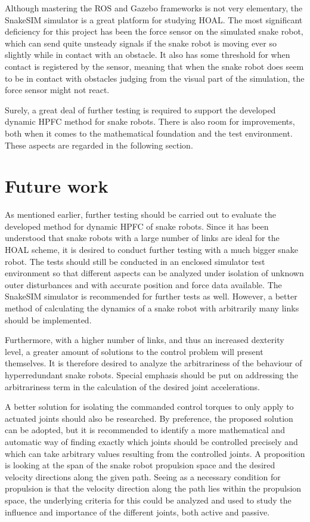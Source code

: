 Although mastering the ROS and Gazebo frameworks is not very elementary, the SnakeSIM simulator is a great platform for studying HOAL. The most significant deficiency for this project has been the force sensor on the simulated snake robot, which can send quite unsteady signals if the snake robot is moving ever so slightly while in contact with an obstacle. It also has some threshold for when contact is registered by the sensor, meaning that when the snake robot does seem to be in contact with obstacles judging from the visual part of the simulation, the force sensor might not react.

Surely, a great deal of further testing is required to support the developed dynamic HPFC method for snake robots. There is also room for improvements, both when it comes to the mathematical foundation and the test environment. These aspects are regarded in the following section.

\section{Future work}

As mentioned earlier, further testing should be carried out to evaluate the developed method for dynamic HPFC of snake robots. Since it has been understood that snake robots with a large number of links are ideal for the HOAL scheme, it is desired to conduct further testing with a much bigger snake robot. The tests should still be conducted in an enclosed simulator test environment so that different aspects can be analyzed under isolation of unknown outer disturbances and with accurate position and force data available. The SnakeSIM simulator is recommended for further tests as well. However, a better method of calculating the dynamics of a snake robot with arbitrarily many links should be implemented.

Furthermore, with a higher number of links, and thus an increased dexterity level, a greater amount of solutions to the control problem will present themselves. It is therefore desired to analyze the arbitrariness of the behaviour of hyperredundant snake robots. Special emphasis should be put on addressing the arbitrariness term in the calculation of the desired joint accelerations.

A better solution for isolating the commanded control torques to only apply to actuated joints should also be researched. By preference, the proposed solution can be adopted, but it is recommended to identify a more mathematical and automatic way of finding exactly which joints should be controlled precisely and which can take arbitrary values resulting from the controlled joints. A proposition is looking at the span of the snake robot propulsion space and the desired velocity directions along the given path. Seeing as a necessary condition for propulsion is that the velocity direction along the path lies within the propulsion space, the underlying criteria for this could be analyzed and used to study the influence and importance of the different joints, both active and passive.

